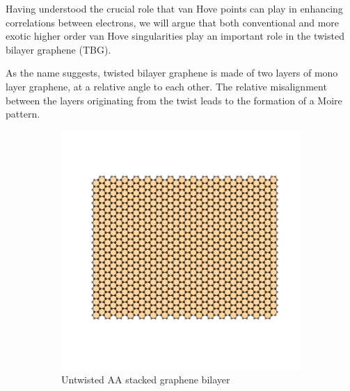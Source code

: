 \par
Having understood the crucial role that van Hove points can play in enhancing correlations between electrons, we will argue that both conventional and more exotic higher order van Hove singularities play an important role in the twisted bilayer graphene (TBG). 
\par
As the name suggests, twisted bilayer graphene is made of two layers of mono layer graphene, at a relative angle to each other. The relative misalignment between the layers originating from the twist leads to the formation of a Moire pattern. 
\begin{figure}
    \centering
    \begin{subfigure}[t]{0.45\linewidth}
        \centering
        \includegraphics[width=\linewidth]{figures/introduction/zeroTwist.pdf}
        \caption{\centering Untwisted AA stacked graphene bilayer}
        \label{fig:untwisted}
    \end{subfigure}
    \begin{subfigure}[t]{0.45\linewidth}
        \centering

\end{subfigure}
\end{figure}
